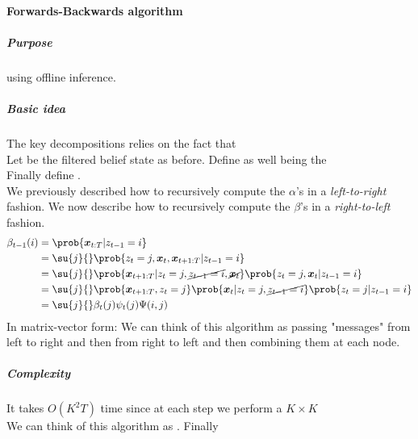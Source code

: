 \paragraph{Forwards-Backwards algorithm}
\subparagraph{Purpose}
 using offline inference.
\subparagraph{Basic idea}
The key decompositions relies on the fact that \\
Let  be the filtered belief state as before.
Define as well  being the \\
Finally define .\\
We previously described how to recursively compute the $\alpha$'s in a \emph{left-to-right} fashion.
We now describe how to recursively compute the $\beta$'s in a \emph{right-to-left} fashion.
\begin{align*}
    \beta_{t-1}(i) &= \prob{\bm{x}_{t:T}|z_{t-1}=i}\\
                   &= \su{j}{}\prob{z_{t}=j,\bm{x}_{t},\bm{x}_{t+1:T}|z_{t-1}=i}\\
                   &= \su{j}{}\prob{\bm{x}_{t+1:T}|z_{t}=j, \cancel{z_{t-1}=i}, \cancel{\bm{x}_{t}}}
                   \prob{z_{t}=j,\bm{x}_{t}|z_{t-1}=i}\\
                   &= \su{j}{}\prob{\bm{x}_{t+1:T},z_{t}=j}\prob{\bm{x}_{t}|z_{t}=j,
                       \cancel{z_{t-1}=i}}\prob{z_{t}=j|z_{t-1}=i}\\
                   &= \su{j}{}\beta_{t}(j)\psi_{t}(j)\Psi(i,j)
\end{align*}
In matrix-vector form: 
We can think of this algorithm as passing "messages" from left to right and then from right to
left and then combining them at each node.
\subparagraph{Complexity}
It takes $O(K^{2}T)$ time since at each step we perform a $K\times K$\\
We can think of this algorithm as . Finally 
\begin{center}
\end{center}



